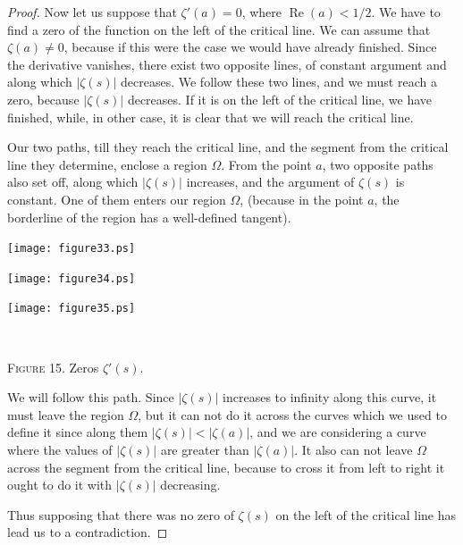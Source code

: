 \documentclass[a4paper]{amsart}
\numberwithin{equation}{section}
\def\Re{\operatorname{\text{Re}}}
\begin{document}
\begin{large}
\begin{proof}[Proof]
Now let us suppose  that $\zeta'(a)=0$, where $\Re(a)<1/2$. We have to find a
zero of the function on the left of the critical line. We can assume that
$\zeta(a)\not=0$, because if this were the case we would have already finished.
Since the derivative vanishes, there exist two opposite lines, of constant
argument and along which $|\zeta(s)|$ decreases. We follow these two
lines, and we must reach a zero, because $|\zeta(s)|$ decreases. If it
is on the left of the critical line, we have finished, while, in other case, it
is clear that we will reach the critical line.

Our two paths, till they reach the critical line, and the segment from the
critical line they determine, enclose a region $\Omega$. From the point $a$,
two opposite paths also set off, along which $|\zeta(s)|$ increases,
and the argument of $\zeta(s)$ is constant. One of them enters our region
$\Omega$, (because in the point $a$, the borderline of the region has a
well-defined tangent). 
\vfil\eject

\begin{minipage}{320pt}
\begin{minipage}{97.6pt} 
\texttt{[image: figure33.ps]}
\end{minipage}\hfil
\begin{minipage}{97.6pt}
\texttt{[image: figure34.ps]}
\end{minipage}\hfil
\begin{minipage}{101.6pt}
\texttt{[image: figure35.ps]}
\end{minipage}
\centerline{\ }
\centerline{{\scshape Figure} 15. Zeros $\zeta'(s)$.}
\end{minipage}



\noindent
We will follow this path. Since $\vert\zeta(s)\vert$
increases to infinity along this curve, it must leave the region $\Omega$, but
it can not do it across the curves which we used to define it since along them
$|\zeta(s)|<|\zeta(a)|$, and we are considering a curve where
the values of $\vert\zeta(s)\vert$ are greater than $|\zeta(a)|$. It
also can not leave $\Omega$ across the segment from the critical line, because
to cross it from left to right it ought to do it with $|\zeta(s)|$
decreasing.

Thus supposing that there was no zero of $\zeta(s)$ on the left of the critical
line has lead us to a contradiction.
\end{proof}



\end{large}
\end{document}

